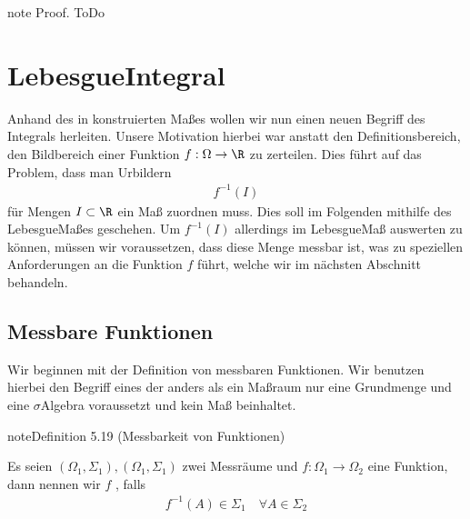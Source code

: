 \documentclass[letterpaper,10pt,german]{jupyterBook}
\begin{document}
\begin{sphinxadmonition}{note}
\sphinxAtStartPar
Proof. ToDo
\end{sphinxadmonition}


\section{Lebesgue\sphinxhyphen{}Integral}
\label{\detokenize{masstheorie/lebesgue_integral:lebesgue-integral}}\label{\detokenize{masstheorie/lebesgue_integral::doc}}
\sphinxAtStartPar
Anhand des in {\hyperref[\detokenize{masstheorie/masstheorie:s-lebesguemeasure}]{}} konstruierten Maßes wollen wir nun einen neuen Begriff des Integrals herleiten. Unsere Motivation hierbei war anstatt den Definitionsbereich, den Bildbereich einer Funktion \(f:\Omega\to\R\) zu zerteilen. Dies führt auf das Problem, dass man Urbildern
\begin{equation*}
\begin{split}f^{-1}(I)\end{split}
\end{equation*}
\sphinxAtStartPar
für Mengen \(I\subset\R\) ein Maß zuordnen muss. Dies soll im Folgenden mithilfe des Lebesgue\sphinxhyphen{}Maßes geschehen. Um \(f^{-1}(I)\) allerdings im Lebesgue\sphinxhyphen{}Maß auswerten zu können, müssen wir voraussetzen, dass diese Menge messbar ist, was zu speziellen Anforderungen an die Funktion \(f\) führt, welche wir im nächsten Abschnitt behandeln.


\subsection{Messbare Funktionen}
\label{\detokenize{masstheorie/lebesgue_integral:messbare-funktionen}}
\sphinxAtStartPar
Wir beginnen mit der Definition von messbaren Funktionen. Wir benutzen hierbei den Begriff eines  der anders als ein Maßraum nur eine Grundmenge und eine \(\sigma\)\sphinxhyphen{}Algebra voraussetzt und kein Maß beinhaltet.
\label{masstheorie/lebesgue_integral:definition-0}
\begin{sphinxadmonition}{note}{Definition 5.19 (Messbarkeit von Funktionen)}



\sphinxAtStartPar
Es seien \((\Omega_1,\Sigma_1), (\Omega_1,\Sigma_1)\) zwei Messräume und \(f:\Omega_1\to\Omega_2\) eine Funktion, dann nennen wir \(f\) , falls
\begin{equation*}
\begin{split}f^{-1}(A)\in\Sigma_1\quad\forall A\in\Sigma_2\end{split}
\end{equation*}\end{sphinxadmonition}
\end{document}

